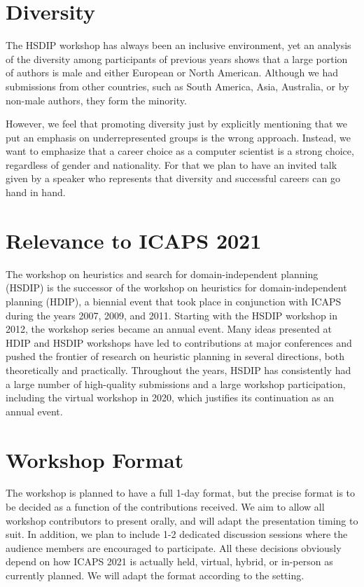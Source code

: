 \documentclass[10pt]{article}
\begin{document}
\section*{Diversity}
The HSDIP workshop has always been an inclusive environment, yet an analysis
of the diversity among participants of previous years shows that a large portion
of authors is male and either European or North American. Although we had
submissions from other countries, such as South America, Asia, Australia, or by
non-male authors, they form the minority.

However, we feel that promoting diversity just by explicitly mentioning that we
put an emphasis on underrepresented groups is the wrong approach. Instead, we
want to emphasize that a career choice as a computer scientist is a strong choice,
regardless of gender and nationality. For that we plan to have an invited talk
given by a speaker who represents that diversity and successful careers can go
hand in hand. 




\section*{Relevance to ICAPS 2021}

The workshop on heuristics and search for domain-independent planning (HSDIP) is
the successor of the workshop on heuristics for domain-independent planning
(HDIP), a biennial event that took place in conjunction with ICAPS during the
years 2007, 2009, and 2011. Starting with the HSDIP workshop in 2012, the
workshop series became an annual event.
Many ideas presented at HDIP and HSDIP workshops have led to contributions at major 
conferences and pushed the frontier of research on heuristic planning in several 
directions, both theoretically and practically. Throughout the years, HSDIP has 
consistently had a large number of high-quality submissions and a large workshop 
participation, including the virtual workshop in 2020, which justifies its 
continuation as an annual event.

\section*{Workshop Format}

The workshop is planned to have a full 1-day format, but the precise
format is to be decided as a function of the contributions received.
We aim to allow all workshop contributors to present orally, and will
adapt the presentation timing to suit. In addition, we plan to include
1-2 dedicated discussion sessions where the audience members are
encouraged to participate. All these decisions obviously depend on how ICAPS 2021
is actually held, virtual, hybrid, or in-person as currently planned. We
will adapt the format according to the setting.
\end{document}
